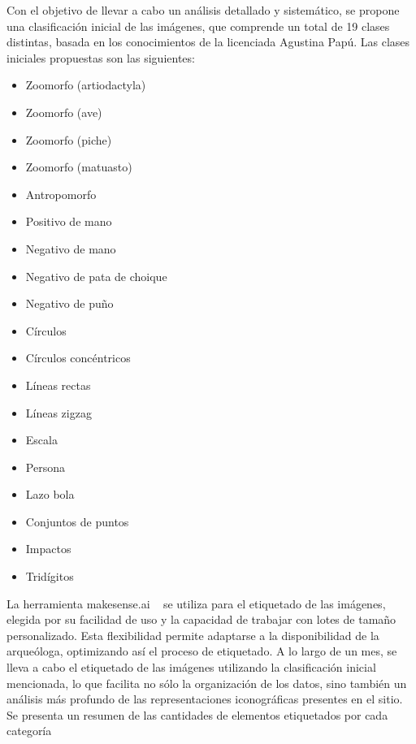 Con el objetivo de llevar a cabo un análisis detallado y sistemático, se propone una clasificación inicial de las imágenes, que comprende un total de 19 clases distintas, basada en los conocimientos de la licenciada Agustina Papú.
Las clases iniciales propuestas son las siguientes:

\begin{itemize}
    \item Zoomorfo (artiodactyla)
    \item Zoomorfo (ave)
    \item Zoomorfo (piche)
    \item Zoomorfo (matuasto)
    \item Antropomorfo
    \item Positivo de mano
    \item Negativo de mano
    \item Negativo de pata de choique
    \item Negativo de puño
    \item Círculos
    \item Círculos concéntricos
    \item Líneas rectas
    \item Líneas zigzag
    \item Escala
    \item Persona
    \item Lazo bola
    \item Conjuntos de puntos
    \item Impactos
    \item Tridígitos
\end{itemize}

La herramienta makesense.ai ~\cite{makesense} se utiliza para el etiquetado de las imágenes, elegida por su facilidad de uso y la capacidad de trabajar con lotes de tamaño personalizado.
Esta flexibilidad permite adaptarse a la disponibilidad de la arqueóloga, optimizando así el proceso de etiquetado.
A lo largo de un mes, se lleva a cabo el etiquetado de las imágenes utilizando la clasificación inicial mencionada, lo que facilita no sólo la organización de los datos, sino también un análisis más profundo de las representaciones iconográficas presentes en el sitio.
Se presenta un resumen de las cantidades de elementos etiquetados por cada categoría

